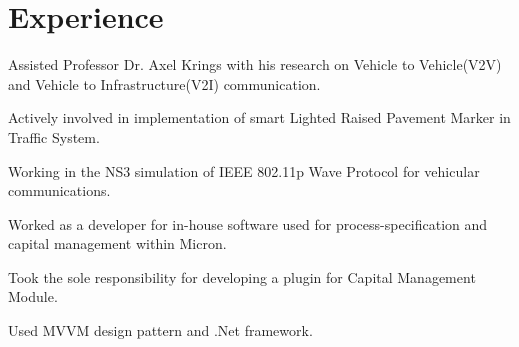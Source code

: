 \documentclass[]{deedy-resume-openfont}
\begin{document}
\section{Experience}
\begin{tightemize}
\item Assisted Professor Dr. Axel Krings with his research on Vehicle to Vehicle(V2V) and Vehicle to Infrastructure(V2I) communication.
\item Actively involved in implementation of smart Lighted Raised Pavement Marker in Traffic System.
\item Working in the NS3 simulation of IEEE 802.11p Wave Protocol for vehicular communications.
\end{tightemize}
\sectionsep

\begin{tightemize}
\item Worked as a developer for in-house software used for process-specification and capital management within Micron.
\item Took the sole responsibility for developing a plugin for Capital Management Module.
\item Used MVVM design pattern and .Net framework.
\end{tightemize}
\sectionsep

\end{document}
